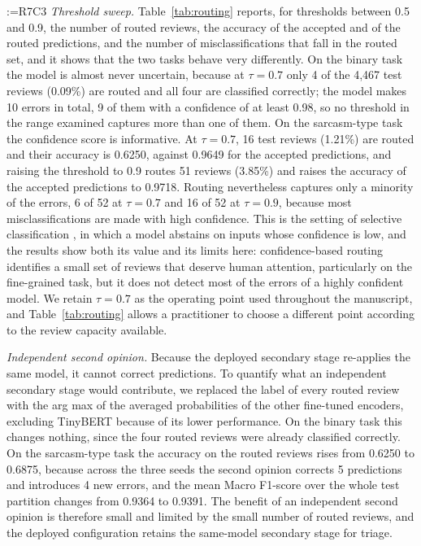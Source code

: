 \documentclass[a4paper,fleqn]{cas-sc}
\makeatletter
\newif\iftracked
\newcommand{\rv@setcolour}[1]{%
  \IfStrEq{#1}{R7C7}{\color{rvEdit}}{%
    \IfSubStr{#1}{R5}{\IfSubStr{#1}{R7}{\color{rvBoth}}{\color{rvFive}}}{\color{rvSeven}}}}
\newcommand{\rv@tag}[1]{\textsuperscript{\sffamily\bfseries\scriptsize[\StrSubstitute{#1}{,}{, }]}\,}
\newcommand{\rv@recordone}[1]{%
  \edef\rv@i{#1}%
  \ifcsdef{rv@n@\rv@i}{}{\csgdef{rv@n@\rv@i}{0}}%
  \csxdef{rv@n@\rv@i}{\the\numexpr\csuse{rv@n@\rv@i}+1\relax}%
  \begingroup\edef\@currentlabel{\rv@i}\label{rv:\rv@i:\csuse{rv@n@\rv@i}}\endgroup}
\newcommand{\rv@record}[1]{\@for\rv@id:=#1\do{\expandafter\rv@recordone\expandafter{\rv@id}}}
\newenvironment{rcblock}[1]{\rv@record{#1}\iftracked\rv@setcolour{#1}\leavevmode\rv@tag{#1}\fi\ignorespaces}{\par}
\makeatother
\begin{document}
\begin{rcblock}{R7C3}
\textit{Threshold sweep.} Table~\ref{tab:routing} reports, for thresholds between 0.5 and 0.9, the number of routed reviews, the accuracy of the accepted and of the routed predictions, and the number of misclassifications that fall in the routed set, and it shows that the two tasks behave very differently. On the binary task the model is almost never uncertain, because at $\tau = 0.7$ only 4 of the 4,467 test reviews (0.09\%) are routed and all four are classified correctly; the model makes 10 errors in total, 9 of them with a confidence of at least 0.98, so no threshold in the range examined captures more than one of them. On the sarcasm-type task the confidence score is informative. At $\tau = 0.7$, 16 test reviews (1.21\%) are routed and their accuracy is 0.6250, against 0.9649 for the accepted predictions, and raising the threshold to 0.9 routes 51 reviews (3.85\%) and raises the accuracy of the accepted predictions to 0.9718. Routing nevertheless captures only a minority of the errors, 6 of 52 at $\tau = 0.7$ and 16 of 52 at $\tau = 0.9$, because most misclassifications are made with high confidence. This is the setting of selective classification \citep{geifman2017selective}, in which a model abstains on inputs whose confidence is low, and the results show both its value and its limits here: confidence-based routing identifies a small set of reviews that deserve human attention, particularly on the fine-grained task, but it does not detect most of the errors of a highly confident model. We retain $\tau = 0.7$ as the operating point used throughout the manuscript, and Table~\ref{tab:routing} allows a practitioner to choose a different point according to the review capacity available.

\textit{Independent second opinion.} Because the deployed secondary stage re-applies the same model, it cannot correct predictions. To quantify what an independent secondary stage would contribute, we replaced the label of every routed review with the arg max of the averaged probabilities of the other fine-tuned encoders, excluding TinyBERT because of its lower performance. On the binary task this changes nothing, since the four routed reviews were already classified correctly. On the sarcasm-type task the accuracy on the routed reviews rises from 0.6250 to 0.6875, because across the three seeds the second opinion corrects 5 predictions and introduces 4 new errors, and the mean Macro F1-score over the whole test partition changes from 0.9364 to 0.9391. The benefit of an independent second opinion is therefore small and limited by the small number of routed reviews, and the deployed configuration retains the same-model secondary stage for triage.
\end{rcblock}
\end{document}
